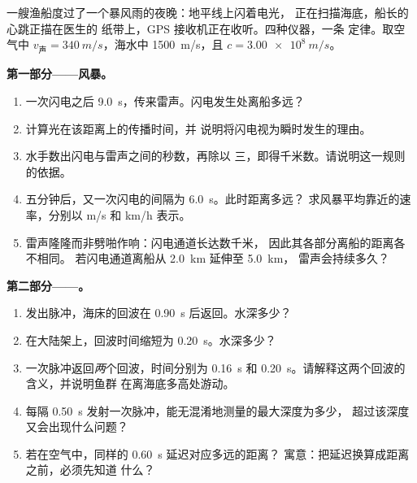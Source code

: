 \begin{problem}[{周末问题——读懂世界的信号：一条
定律，$d = v\,t$，用来测定风暴距离、绘制海床、计数心跳，并
探究 GPS 的工作原理}]
\label{pb:g10:signals-and-waves:1}
一艘渔船度过了一个暴风雨的夜晚：地平线上闪着电光，
正在扫描海底，船长的心跳正描在医生的
纸带上，GPS 接收机正在收听。四种仪器，一条
定律。取空气中 $v_{\text{声}} = \qty{340}{m/s}$，海水中
\qty{1500}{m/s}，且 $c = \qty{3.00e8}{m/s}$。

\medskip
\noindent\textbf{第一部分——风暴。}
\begin{enumerate}
  \item 一次闪电之后 \qty{9.0}{s}，传来雷声。闪电发生处离船多远？
  \item 计算光在该距离上的传播时间，并
        说明将闪电视为瞬时发生的理由。
  \item 水手数出闪电与雷声之间的秒数，再除以
        三，即得千米数。请说明这一规则的依据。
  \item 五分钟后，又一次闪电的间隔为 \qty{6.0}{s}。此时距离多远？
        求风暴平均靠近的速率，分别以 \unit{m/s} 和 \unit{km/h} 表示。
  \item 雷声隆隆而非劈啪作响：闪电通道长达数千米，
        因此其各部分离船的距离各不相同。
        若闪电通道离船从 \qty{2.0}{km} 延伸至 \qty{5.0}{km}，
        雷声会持续多久？
\end{enumerate}

\medskip
\noindent\textbf{第二部分——。}
\begin{enumerate}[resume]
  \item {}发出脉冲，海床的回波在 \qty{0.90}{s} 后返回。水深多少？
  \item 在大陆架上，回波时间缩短为 \qty{0.20}{s}。水深多少？
  \item 一次脉冲返回\emph{两}个回波，时间分别为 \qty{0.16}{s} 和
        \qty{0.20}{s}。请解释这两个回波的含义，并说明鱼群
        在离海底多高处游动。
  \item {}每隔 \qty{0.50}{s} 发射一次脉冲，能无混淆地测量的最大深度为多少，
        超过该深度又会出现什么问题？
  \item 若在空气中，同样的 \qty{0.60}{s} 延迟对应多远的距离？
        寓意：把延迟换算成距离之前，必须先知道
        什么？
\end{enumerate}


\end{problem}
